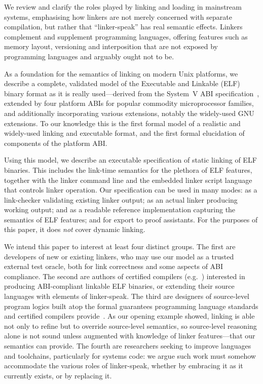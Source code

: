 \begin{verytightitemize}
\item
We review and clarify the roles played by linking and loading in mainstream systems, emphasising
how linkers are not merely concerned with separate compilation, but rather that ``linker-speak'' has real semantic effects.
Linkers complement and supplement programming languages, offering features such as memory layout, versioning and interposition that are not exposed by programming languages and arguably ought not to be.

\item As a foundation for the semantics of linking on modern Unix platforms, we describe a complete, validated  model of the Executable and Linkable (ELF) binary format as it is really used---derived from the System~V ABI specification~\cite{elf-sco-model}, extended by four platform ABIs for popular commodity microprocessor families, and additionally incorporating various extensions, notably the widely-used GNU extensions. 
To our knowledge this is the first formal model of a realistic and widely-used linking and executable format, and the first formal elucidation of components of the platform ABI.

\item Using this model, we describe an executable specification of static linking of ELF binaries.
This includes the link-time semantics for the plethora of ELF features, 
together with the linker command line and the embedded linker script language
that controls linker operation.
Our specification can be used in many modes: 
as a link-checker validating existing linker output; 
as an actual linker producing working output; 
and as a readable reference implementation capturing the semantics of ELF features; 
and for export to proof assistants.
For the purposes of this paper, it does \emph{not} cover dynamic linking.
\end{verytightitemize}

We intend this paper to interest at least four distinct groups.
The first are developers of new or existing linkers, who may use our model as a trusted external test oracle, both for link correctness and some aspects of ABI compliance.
The second are authors of certified compilers (e.g.~\cite{amadio-certified-2014, kumar-cake-2014, leroy-formal-2009, sevcik-compcert-2013}) interested in producing ABI-compliant linkable ELF binaries, or extending their source languages with elements of linker-speak. 
The third are designers of source-level program logics built atop the formal guarantees programming language standards and certified compilers provide~\cite{appel-program-2014}.
As our opening example showed, linking is able not only to refine but to override source-level semantics, so source-level reasoning alone is not sound unless augmented with knowledge of linker features---that our semantics can provide.
The fourth are researchers seeking to improve languages and toolchains, particularly for systems code: we argue such work must somehow accommodate the various roles of linker-speak, whether by embracing it as it currently exists, or by replacing it.

